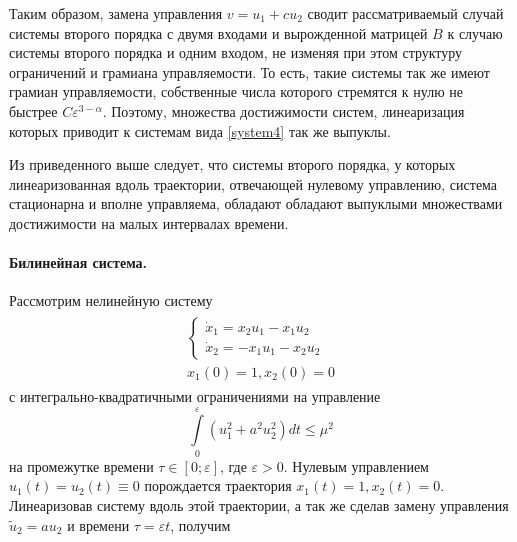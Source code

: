 \documentclass[../main.tex]{subfiles}
\begin{document}
 Таким образом, замена управления $ v = u_1 + c u_2 $ сводит рассматриваемый случай системы второго порядка с двумя входами и вырожденной матрицей $ B $ к случаю системы второго порядка и одним входом, не изменяя при этом структуру ограничений и грамиана управляемости. То есть, такие системы так же имеют грамиан управляемости, собственные числа которого стремятся к нулю не быстрее $ C \varepsilon^{3-\alpha} $. Поэтому, множества достижимости систем, линеаризация которых приводит к системам вида \eqref{system4} так же выпуклы.
 
 Из приведенного выше следует, что системы второго порядка, у которых линеаризованная вдоль траектории, отвечающей нулевому управлению, система стационарна и вполне управляема, обладают обладают выпуклыми множествами достижимости на малых интервалах времени.
 \paragraph{Билинейная система.}
 Рассмотрим нелинейную систему
 \begin{gather}\label{system5}
	 \begin{gathered}
		 \left\{ {\begin{array}{*{20}{l}}
				 {\dot{x}_1 =  x_2 u_1 - x_1 u_2}\\
				 {\dot{x}_2 =  -x_1 u_1 - x_2 u_2}
		 \end{array}} \right.
		 \\
		 x_1(0) = 1, x_2(0) = 0
	 \end{gathered}
 \end{gather}
 с интегрально-квадратичными ограничениями на управление
 \begin{equation*}
	 \int \limits_0^{\varepsilon} \left( u_1^2 + a^2 u_2^2\right) dt \leq \mu^2
 \end{equation*} 	
 на промежутке времени $ \tau \in \left[0;\varepsilon \right] $, где $ \varepsilon > 0 $. Нулевым управлением $  u_1(t) = u_2(t) \equiv 0 $ порождается траектория $ x_1(t) = 1, x_2(t) = 0 $. Линеаризовав систему вдоль этой траектории, а так же сделав замену управления $ {\tilde u_2} = a u_2 $ и времени  $ \tau =\varepsilon t$, получим
\end{document}
